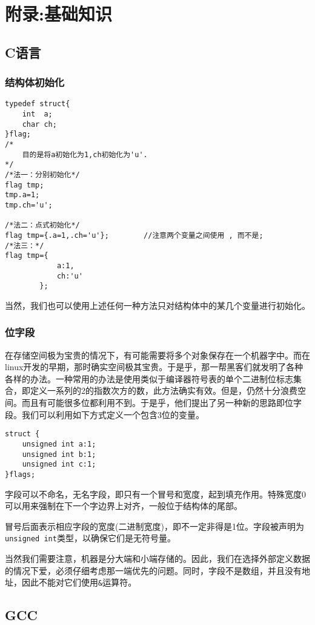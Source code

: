 \chapter{附录:基础知识}

\minitoc

	\section{C语言}
		\subsection{结构体初始化}
\begin{verbatim}
typedef struct{
	int  a;
	char ch;
}flag;
/*
	目的是将a初始化为1,ch初始化为'u'.
*/
/*法一：分别初始化*/
flag tmp;
tmp.a=1;
tmp.ch='u';

/*法二：点式初始化*/
flag tmp={.a=1,.ch='u'};		//注意两个变量之间使用 , 而不是;
/*法三：*/
flag tmp={
			a:1,
			ch:'u'
		};
\end{verbatim}
			当然，我们也可以使用上述任何一种方法只对结构体中的某几个变量进行初始化。

		\subsection{位字段}
			在存储空间极为宝贵的情况下，有可能需要将多个对象保存在一个机器字中。而在linux开发的早期，那时确实空间极其宝贵。于是乎，那一帮黑客们就发明了各种各样的办法。一种常用的办法是使用类似于编译器符号表的单个二进制位标志集合，即定义一系列的2的指数次方的数，此方法确实有效。但是，仍然十分浪费空间。而且有可能很多位都利用不到。于是乎，他们提出了另一种新的思路即位字段。我们可以利用如下方式定义一个包含3位的变量。

\begin{verbatim}
struct {
	unsigned int a:1;
	unsigned int b:1;
	unsigned int c:1;
}flags;
\end{verbatim}
			
			字段可以不命名，无名字段，即只有一个冒号和宽度，起到填充作用。特殊宽度0可以用来强制在下一个字边界上对齐，一般位于结构体的尾部。
			
			冒号后面表示相应字段的宽度(二进制宽度)，即不一定非得是1位。字段被声明为\texttt{unsigned int}类型，以确保它们是无符号量。

			当然我们需要注意，机器是分大端和小端存储的。因此，我们在选择外部定义数据的情况下爱，必须仔细考虑那一端优先的问题。同时，字段不是数组，并且没有地址，因此不能对它们使用\texttt{&}运算符。	
	\section{GCC}
